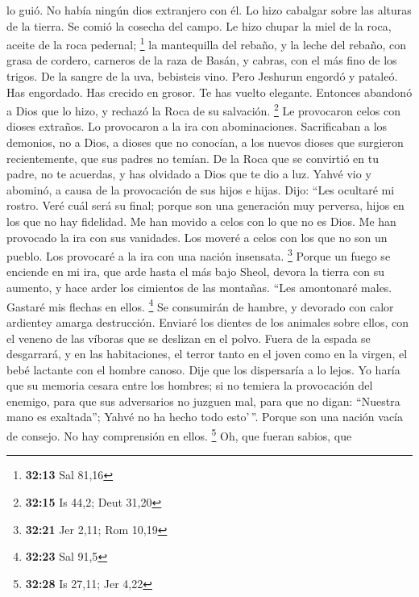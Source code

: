 lo guió. No había ningún dios extranjero con él.  Lo hizo
cabalgar sobre las alturas de la tierra. Se comió la cosecha del campo.
Le hizo chupar la miel de la roca, aceite de la roca pedernal;
\footnote{\textbf{32:13} Sal 81,16}  la mantequilla del
rebaño, y la leche del rebaño, con grasa de cordero, carneros de la raza
de Basán, y cabras, con el más fino de los trigos. De la sangre de la
uva, bebisteis vino.  Pero Jeshurun engordó y pataleó.
Has engordado. Has crecido en grosor. Te has vuelto elegante. Entonces
abandonó a Dios que lo hizo, y rechazó la Roca de su salvación.
\footnote{\textbf{32:15} Is 44,2; Deut 31,20}  Le
provocaron celos con dioses extraños. Lo provocaron a la ira con
abominaciones.  Sacrificaban a los demonios, no a Dios, a
dioses que no conocían, a los nuevos dioses que surgieron recientemente,
que sus padres no temían.  De la Roca que se convirtió en
tu padre, no te acuerdas, y has olvidado a Dios que te dio a luz.
 Yahvé vio y abominó, a causa de la provocación de sus
hijos e hijas.  Dijo: ``Les ocultaré mi rostro. Veré cuál
será su final; porque son una generación muy perversa, hijos en los que
no hay fidelidad.  Me han movido a celos con lo que no es
Dios. Me han provocado la ira con sus vanidades. Los moveré a celos con
los que no son un pueblo. Los provocaré a la ira con una nación
insensata. \footnote{\textbf{32:21} Jer 2,11; Rom 10,19} 
Porque un fuego se enciende en mi ira, que arde hasta el más bajo Sheol,
devora la tierra con su aumento, y hace arder los cimientos de las
montañas.  ``Les amontonaré males. Gastaré mis flechas en
ellos. \footnote{\textbf{32:23} Sal 91,5}  Se consumirán
de hambre, y devorado con calor ardientey amarga destrucción. Enviaré
los dientes de los animales sobre ellos, con el veneno de las víboras
que se deslizan en el polvo.  Fuera de la espada se
desgarrará, y en las habitaciones, el terror tanto en el joven como en
la virgen, el bebé lactante con el hombre canoso.  Dije
que los dispersaría a lo lejos. Yo haría que su memoria cesara entre los
hombres;  si no temiera la provocación del enemigo, para
que sus adversarios no juzguen mal, para que no digan: ``Nuestra mano es
exaltada''; Yahvé no ha hecho todo esto'\,''.  Porque son
una nación vacía de consejo. No hay comprensión en ellos. \footnote{\textbf{32:28}
  Is 27,11; Jer 4,22}  Oh, que fueran sabios, que
